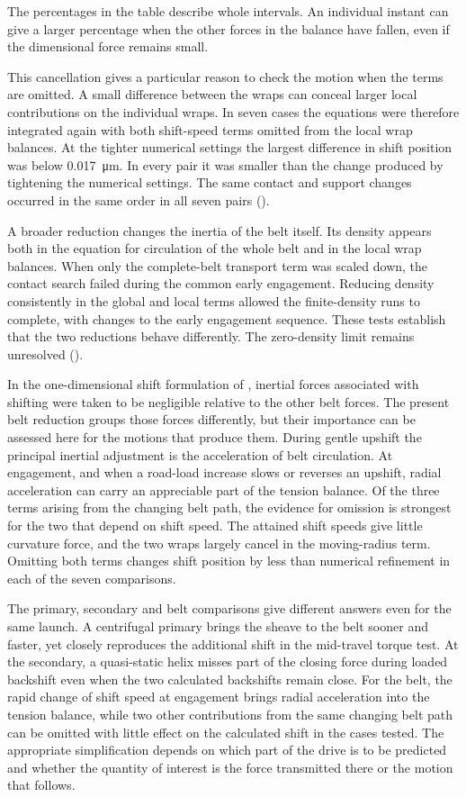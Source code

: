 \documentclass[11pt]{report}
\numberwithin{equation}{section}
\begin{document}
The percentages in the table describe whole intervals. An individual
instant can give a larger percentage when the other forces in the
balance have fallen, even if the dimensional force remains small.

This cancellation gives a particular reason to check the motion when
the terms are omitted. A small difference between the wraps can conceal
larger local contributions on the individual wraps. In seven cases the equations
were therefore integrated again with both shift-speed terms omitted
from the local wrap balances. At the tighter numerical settings the
largest difference in shift position was below
\SI{0.017}{\micro\metre}. In every pair it was smaller than the change
produced by tightening the numerical settings. The same contact and
support changes occurred in the same order in all seven pairs
().

A broader reduction changes the inertia of the belt itself. Its density
appears both in the equation for circulation of the whole belt and in
the local wrap balances. When only the complete-belt transport term was
scaled down, the contact search failed during the common early
engagement. Reducing density consistently in the global and local
terms allowed the finite-density runs to complete, with changes to
the early engagement sequence. These tests establish that the two
reductions behave differently. The zero-density limit remains unresolved
().

In the one-dimensional shift formulation of \citet{Sorge2008}, inertial
forces associated with shifting were taken to be negligible relative to
the other belt forces. The present belt reduction groups those forces differently, but their
importance can be assessed here for the motions that produce them. During gentle upshift the
principal inertial adjustment is the acceleration of belt circulation.
At engagement, and when a road-load increase slows or reverses an
upshift, radial acceleration can carry an appreciable part of the
tension balance. Of the three terms arising from the changing belt
path, the evidence for omission is strongest for the two that depend on
shift speed. The attained shift speeds give little curvature force, and the two
wraps largely cancel in the moving-radius term. Omitting both terms
changes shift position by less than numerical refinement in each of
the seven comparisons.

The primary, secondary and belt comparisons give different answers even
for the same launch. A centrifugal primary brings the sheave to the belt
sooner and faster, yet closely reproduces the additional shift in the
mid-travel torque test. At the secondary, a quasi-static helix misses
part of the closing force during loaded backshift even when the two
calculated backshifts remain close. For the belt, the rapid change of
shift speed at engagement brings radial acceleration into the tension
balance, while two other contributions from the same changing belt path
can be omitted with little effect on the calculated shift in the cases
tested. The appropriate simplification depends on which part of the
drive is to be predicted and whether the quantity of interest is the
force transmitted there or the motion that follows.
\FloatBarrier
\end{document}
